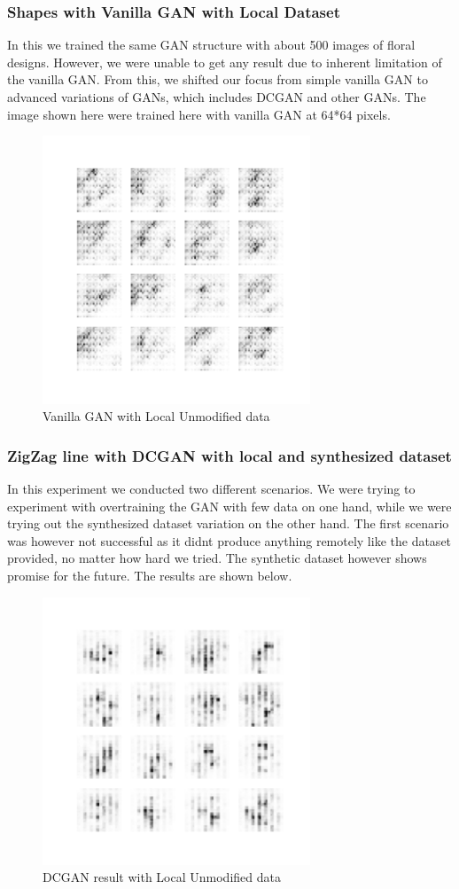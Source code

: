 \documentclass{article}
\begin{document}
\subsubsection{Shapes with Vanilla GAN with Local Dataset}
In this we trained the same GAN structure with about 500 images of floral designs. However, we were unable to get any result due to inherent limitation of the vanilla GAN. From this, we shifted our focus from simple vanilla GAN to advanced variations of GANs, which includes DCGAN and other GANs. The image shown here were trained here with vanilla GAN at 64*64 pixels.
\begin{figure}[H]
    \centering
    \includegraphics[width=8cm]{images/GAN/GANunmodified.png}
    \caption{Vanilla GAN with Local Unmodified data}
\end{figure}


\subsubsection{ZigZag line with DCGAN with local and synthesized dataset}
In this experiment we conducted two different scenarios. We were trying to experiment with overtraining the GAN with few data on one hand, while we were trying out the synthesized dataset variation on the other hand. The first scenario was however not successful as it didnt produce anything remotely like the dataset provided, no matter how hard we tried. The synthetic dataset however shows promise for the future. The results are shown below.
\begin{figure}[H]
    \centering
    \includegraphics[width=8cm]{images/GAN/DCGANunmodified.png}
    \caption{DCGAN result with Local Unmodified data}
\end{figure}
\end{document}

